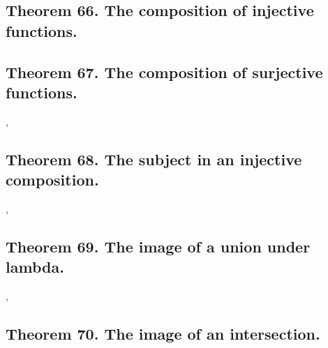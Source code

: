 \documentclass[preview]{standalone}
\begin{document}
\subsection[The composition of injective functions is injective.]
    {
        \color{section}Theorem 66. \color{black} The composition of injective functions.
    }

\pagebreak


\subsection[The composition of surjective functions is surjective.]
    {
        \color{section}Theorem 67. \color{black} The composition of surjective functions.
    }

\sep
\pagebreak


\subsection[The subject function in an injective composition is injective.]
    {
        \color{section}Theorem 68. \color{black} The subject in an injective composition.
    }

\sep
\pagebreak


\subsection[The image of a union under the function lambda.]
    {
        \color{section}Theorem 69. \color{black} The image of a union under lambda.
    }

\sep


\subsection[The image of an intersection under lambda.]
    {
        \color{section}Theorem 70. \color{black} The image of an intersection.
    }

\pagebreak
\end{document}
